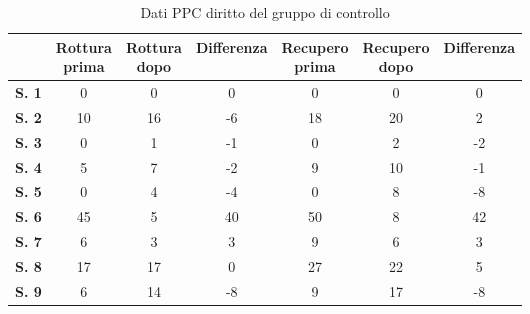 \begin{table}[H]
\begin{center}
\begin{tabular}{|c|c|c|c|c|c|c|} \hline
{\textbf{}} & \pbox{20cm}{\textbf{Rottura} \\ \textbf{prima}} & \pbox{20cm}{\textbf{Rottura} \\ \textbf{dopo}} & \textbf{Differenza} & \pbox{20cm}{\textbf{Recupero} \\ \textbf{prima}} & \pbox{20cm}{\textbf{Recupero} \\ \textbf{dopo}} & \textbf{Differenza} \\ \hline
\textbf{S. 1} & 0 & 0 & 0 & 0 & 0 & 0 \\ \hline
\textbf{S. 2} & 10 & 16 & -6 & 18 & 20 & 2 \\ \hline
\textbf{S. 3} & 0 & 1 & -1 & 0 & 2 & -2 \\ \hline
\textbf{S. 4} & 5 & 7 & -2 & 9 & 10 & -1 \\ \hline
\textbf{S. 5} & 0 & 4 & -4 & 0 & 8 & -8 \\ \hline
\textbf{S. 6} & 45 & 5 & 40 & 50 & 8 & 42  \\ \hline
\textbf{S. 7} & 6 & 3 & 3 & 9 & 6 & 3 \\ \hline
\textbf{S. 8} & 17 & 17 & 0 & 27 & 22 & 5 \\ \hline
\textbf{S. 9} & 6 & 14 & -8 & 9 & 17 & -8 \\ \hline
\end{tabular}
\end{center}
\caption{Dati PPC diritto del gruppo di controllo}
\end{table}

\\\ \\\  

